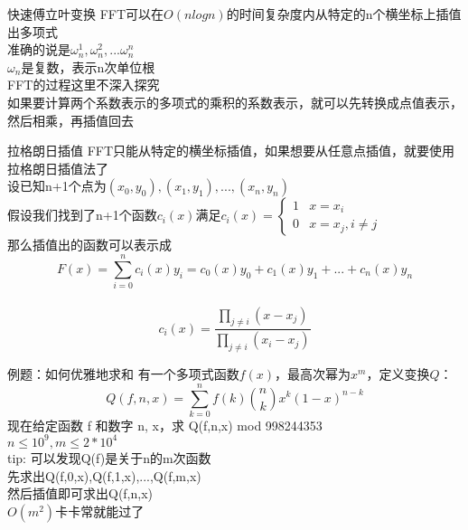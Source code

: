 \documentclass{beamer}
\begin{document}
\begin{frame}{快速傅立叶变换}
FFT可以在$O(nlogn)$的时间复杂度内从特定的n个横坐标上插值出多项式\\
准确的说是$\omega_n^1,\omega_n^2,...\omega_n^n$\\
$\omega_n$是复数，表示n次单位根\\
FFT的过程这里不深入探究\\
如果要计算两个系数表示的多项式的乘积的系数表示，就可以先转换成点值表示，然后相乘，再插值回去
\end{frame}

\begin{frame}{拉格朗日插值}
FFT只能从特定的横坐标插值，如果想要从任意点插值，就要使用拉格朗日插值法了\\
\pause
设已知n+1个点为$(x_0,y_0),(x_1,y_1),...,(x_n,y_n)$\\
假设我们找到了n+1个函数$c_i(x)$满足$c_i(x)=\left\{
\begin{array}{ll}

1&\text{$x=x_i$}\\

0&\text{$x=x_j,i\neq j$}

\end{array}\right.
$\\
\pause
那么插值出的函数可以表示成$$F(x)=\sum_{i=0}^{n}c_i(x)y_i=c_0(x)y_0+c_1(x)y_1+...+c_n(x)y_n$$\\
\pause
$$c_i(x)=\frac{\prod_{j\neq i}(x-x_j)}{\prod_{j\neq i}(x_i-x_j)}$$

\end{frame}

\begin{frame}{例题：如何优雅地求和}
有一个多项式函数$f(x)$，最高次幂为$x^m$，定义变换$Q$：
$$Q(f,n,x)=\sum_{k=0}^{n}f(k)\binom{n}{k}x^k(1-x)^{n-k}$$
现在给定函数 f 和数字 n, x，求 Q(f,n,x) mod 998244353\\
$n\leqslant 10^9,m\leqslant 2*10^4$\\
tip: 可以发现Q(f)是关于n的m次函数\\
\pause
先求出Q(f,0,x),Q(f,1,x),...,Q(f,m,x)\\
然后插值即可求出Q(f,n,x)\\
$O(m^2)$卡卡常就能过了\\
\end{frame}
\end{document}
